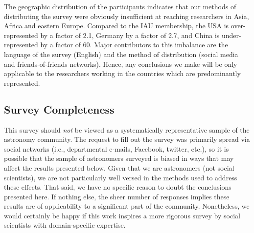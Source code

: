 The geographic distribution of the participants indicates that our methods of distributing the survey were obviously insufficient at reaching researchers in Asia, Africa and eastern Europe. Compared to the \href{http://www.iau.org/administration/membership/individual/distribution/}{IAU membership}, the USA is over-represented by a factor of 2.1, Germany by a factor of 2.7, and China is under-represented by a factor of 60. Major contributors to this imbalance are the language of the survey (English) and the method of distribution (social media and friends-of-friends networks). Hence, any conclusions we make will be only applicable to the researchers working in the countries which are predominantly represented.

\subsection{Survey Completeness}

This survey should \emph{not} be viewed as a systematically representative sample of the astronomy community.  
The request to fill out the survey was primarily spread via social networks (i.e., departmental e-mails, Facebook, twitter, etc.), so it is possible that the sample of astronomers surveyed is biased in ways that may affect the results presented below.
Given that we are astronomers (not social scientists), we are not particularly well versed in the methods used to address these effects.
That said, we have no specific reason to doubt the conclusions presented here.  If nothing else, the sheer number of responses implies these results are of applicability to a significant part of the community.
Nonetheless, we would certainly be happy if this work inspires a more rigorous survey by social scientists with domain-specific expertise.
